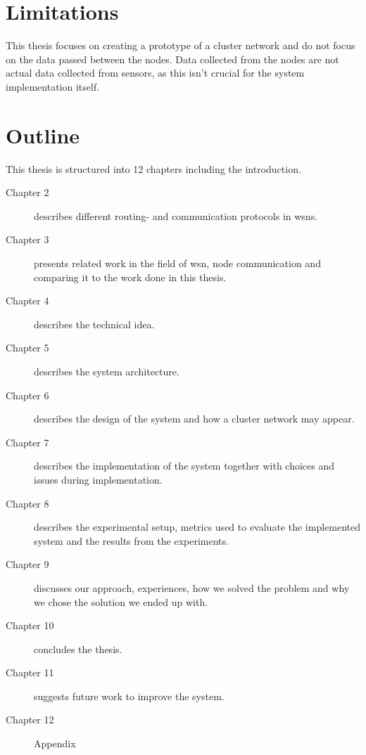 \documentclass[USenglish]{uit-thesis}
\begin{document}

\section{Limitations}
This thesis focuses on creating a prototype of a cluster network and do not focus on the data passed between the nodes. Data collected from the nodes are not actual data collected from sensors, as this isn't crucial for the system implementation itself.


\newpage

\section{Outline}
This thesis is structured into 12 chapters including the introduction.

\begin{description}
\item[Chapter 2] describes different routing- and communication protocols in \glspl{wsn}.
\item[Chapter 3] presents related work in the field of \gls{wsn}, node communication and comparing it to the work done in this thesis.
\item[Chapter 4] describes the technical idea.
\item[Chapter 5] describes the system architecture.
\item[Chapter 6] describes the design of the system and how a cluster network may appear.
\item[Chapter 7] describes the implementation of the system together with choices and issues during implementation.
\item[Chapter 8] describes the experimental setup, metrics used to evaluate the implemented system and the results from the experiments.
\item[Chapter 9] discusses our approach, experiences, how we solved the problem and why we chose the solution we ended up with.
\item[Chapter 10] concludes the thesis.
\item[Chapter 11] suggests future work to improve the system.
\item[Chapter 12] Appendix
\end{description}
\end{document}
